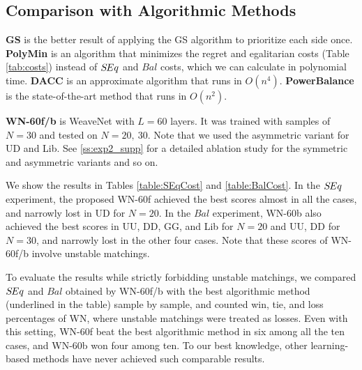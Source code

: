 \subsection{Comparison with Algorithmic Methods}\label{ss:exp2}
{\bf GS} is the better result of applying the GS algorithm \cite{gale1962college} to prioritize each side once. {\bf PolyMin} is an algorithm that minimizes the regret and egalitarian costs (Table \ref{tab:costs}) instead of $S\hspace{-0.1em}Eq$ and $Bal$ costs, which we can calculate in polynomial time.
{\bf DACC} \cite{dworczak2016deferred} is an approximate algorithm that runs in $O(n^4)$. {\bf PowerBalance} is the state-of-the-art method that runs in $O(n^2)$. 

{\bf WN-60f/b} is WeaveNet with $L=60$ layers. It was trained with samples of $N=30$ and tested on $N=20,~30$. 
Note that we used the asymmetric variant for UD and Lib. See \ref{ss:exp2_supp} for a detailed ablation study for the symmetric and asymmetric variants and so on.

We show the results in Tables \ref{table:SEqCost} and \ref{table:BalCost}.
In the $S\hspace{-0.1em}Eq$ experiment, the proposed WN-60f achieved the best scores almost in all the cases, and narrowly lost in UD for $N=20$.
In the $Bal$ experiment, WN-60b also achieved the best scores in UU, DD, GG, and Lib for $N=20$ and UU, DD for $N=30$, and narrowly lost in the other four cases.
Note that these scores of WN-60f/b involve unstable matchings.

To evaluate the results while strictly forbidding unstable matchings, we compared $S\hspace{-0.1em}Eq$ and $Bal$ obtained by WN-60f/b with the best algorithmic method (underlined in the table) sample by sample, and counted win, tie, and loss percentages of WN, where unstable matchings were treated as losses.
Even with this setting, WN-60f beat the best algorithmic method in six among all the ten cases, and WN-60b won four among ten. To our best knowledge, other learning-based methods have never achieved such comparable results.


